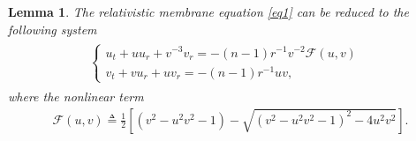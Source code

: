 \documentclass[10pt,leqno]{amsart}
\numberwithin{equation}{section}
\newtheorem{lem}{Lemma}[section]
\begin{document}
\begin{lem} \label{lem u v eq}
	The relativistic membrane equation \eqref{eq1} can be reduced to the following system
	\begin{equation} \label{u v eq2}
		\begin{aligned}
			\begin{split}
				\left\lbrace
				\begin{array}{lr}
					u_{t} + uu_{r} + v^{-3}v_{r} = - (n-1) r^{-1} v^{-2} \mathcal{F} (u,v) &\\ 
					v_{t} + v u_{r} + uv_{r} =- (n-1) r^{-1} uv, &
				\end{array}	
				\right.
			\end{split}	
		\end{aligned}
	\end{equation}
	where the nonlinear term
	\begin{equation} \label{def of F}
		\begin{aligned}
			\mathcal{F}(u,v) \triangleq  \frac{1}{2}[ ( v^{2}-u^{2}v^{2}-1 ) - \sqrt{(v^{2}-u^{2}v^{2}-1)^2 -4u^{2}v^{2} }  ].
		\end{aligned}
	\end{equation}
	
	
	
\end{lem}
\end{document}
